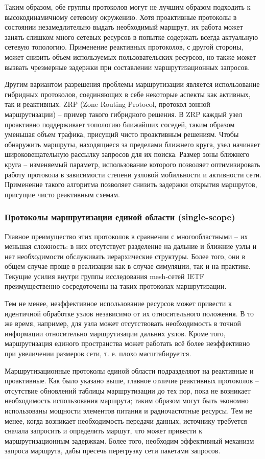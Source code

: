 \documentclass[14pt,a4paper,titlepage]{extarticle}
\begin{document}
Таким образом, обе группы протоколов могут не лучшим образом подходить к высокодинамичному сетевому окружению. Хотя проактивные протоколы в состоянии незамедлительно выдать необходимый маршрут, их работа может занять слишком много сетевых ресурсов в попытке содержать всегда актуальную сетевую топологию. Применение реактивных протоколов, с другой стороны, может снизить объем используемых пользовательских ресурсов, но также может вызвать чрезмерные задержки при составлении маршрутизационных запросов. 

Другим вариантом разрешения проблемы маршрутизации является использование гибридных протоколов, соединяющих в себе некоторые аспекты как активных, так и реактивных. ZRP (Zone Routing Protocol, протокол зонной маршрутизации) -- пример такого гибридного решения. В ZRP каждый узел проактивно поддерживает топологию ближайших соседей, таким образом уменьшая объем трафика, присущий чисто проактивным решениям. Чтобы обнаружить маршруты, находящиеся за пределами ближнего круга, узел начинает широковещательную рассылку запросов для их поиска. Размер зоны ближнего круга -- изменяемый параметр, использование которого позволяет оптимизировать работу протокола в зависимости степени узловой мобильности и активности сети. Применение такого алгоритма позволяет снизить задержки открытия маршрутов, присущие чисто реактивным схемам.

\subsubsection{Протоколы маршрутизации единой области (single-scope)}

Главное преимущество этих протоколов в сравнении с многообластными -- их меньшая сложность: в них отсутствует разделение на дальние и ближние узлы и нет необходимости обслуживать иерархические структуры. Более того, они в общем случае проще в реализации как в случае симуляции, так и на практике. Текущие усилия внутри группы исследования mesh-сетей IETF преимущественно сосредоточены на таких протоколах маршрутизации. 

Тем не менее, неэффективное использование ресурсов может привести к идентичной обработке узлов независимо от их относительного положения. В то же время, например, для узла может отсутствовать необходимость в точной информации относительно маршрутизации дальних узлов. Кроме того, маршрутизация единого пространства может работать всё более неэффективно при увеличении размеров сети, т. е. плохо масштабируется.

Маршрутизационные протоколы единой области подразделяют на реактивные и проактивные. Как было указано выше, главное отличие реактивных протоколов -- отсутствие обновлений таблицы маршрутизации до тех пор, пока не возникает необходимость использования маршрута; таким образом могут быть экономно использованы мощности элементов питания и радиочастотные ресурсы. Тем не менее, когда возникает необходимость передачи данных, источнику требуется сначала запросить и определить маршут, что может привести к маршрутизационным задержкам. Более того, необходим эффективный механизм запроса маршрута, дабы пресечь перегрузку сети пакетами запросов. 
\end{document}
